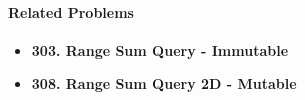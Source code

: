 \paragraph{Related Problems}
\begin{itemize}
\item \textbf{303. Range Sum Query - Immutable}
\item \textbf{308. Range Sum Query 2D - Mutable}
\end{itemize}